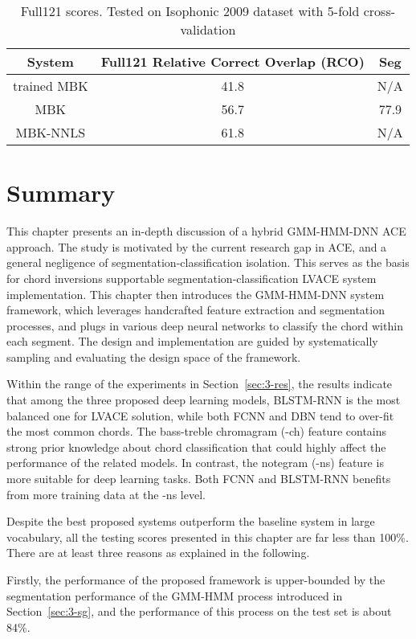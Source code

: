 \begin{table}[h]
\footnotesize
\centering
\caption{Full121 scores. Tested on Isophonic 2009 dataset with 5-fold cross-validation \cite{mauch2010automatic}}
\label{tab:3-fullmbk}
\begin{tabular}{|c|c|c|}\hline
System & Full121 Relative Correct Overlap (RCO) & Seg \\ \hline
trained MBK & 41.8 & N/A \\ \hline
MBK & 56.7 & 77.9 \\ \hline
MBK-NNLS & 61.8 & N/A \\ \hline
\end{tabular}
\end{table}


\section{Summary} \label{sec:3-concln}
This chapter presents an in-depth discussion of a hybrid GMM-HMM-DNN ACE approach. The study is motivated by the current research gap in ACE, and a general negligence of segmentation-classification isolation. This serves as the basis for chord inversions supportable segmentation-classification LVACE system implementation. This chapter then introduces the GMM-HMM-DNN system framework, which leverages handcrafted feature extraction and segmentation processes, and plugs in various deep neural networks to classify the chord within each segment. The design and implementation are guided by systematically sampling and evaluating the design space of the framework.

Within the range of the experiments in Section~\ref{sec:3-res}, the results indicate that among the three proposed deep learning models, BLSTM-RNN is the most balanced one for LVACE solution, while both FCNN and DBN tend to over-fit the most common chords. The bass-treble chromagram (-ch) feature contains strong prior knowledge about chord classification that could highly affect the performance of the related models. In contrast, the notegram (-ns) feature is more suitable for deep learning tasks. Both FCNN and BLSTM-RNN benefits from more training data at the -ns level.

Despite the best proposed systems outperform the baseline system in large vocabulary, all the testing scores presented in this chapter are far less than 100\%. There are at least three reasons as explained in the following.


Firstly, the performance of the proposed framework is upper-bounded by the segmentation performance of the GMM-HMM process introduced in Section~\ref{sec:3-sg}, and the performance of this process on the test set is about 84\%.

